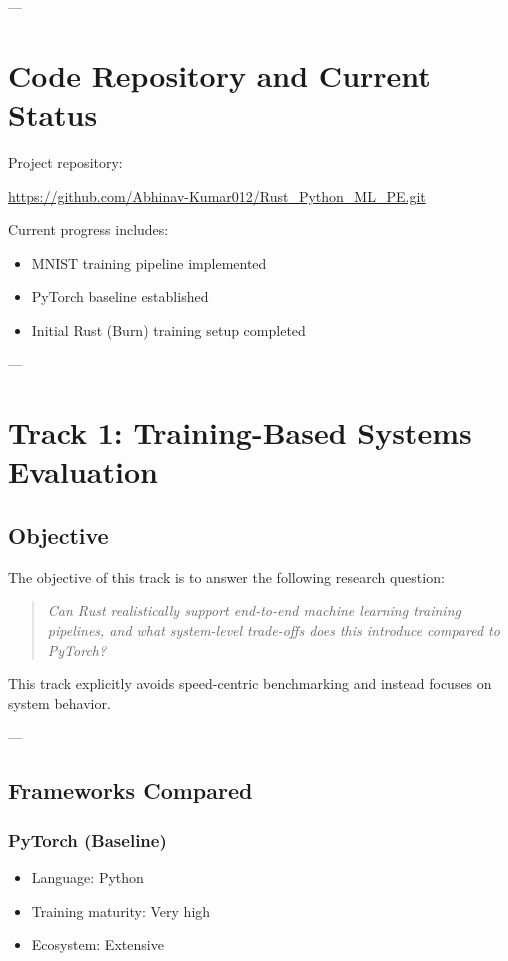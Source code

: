 \documentclass[10pt,a4paper,twocolumn]{article}
\begin{document}
---

\section{Code Repository and Current Status}

Project repository:
\begin{center}
\url{https://github.com/Abhinav-Kumar012/Rust_Python_ML_PE.git}
\end{center}

Current progress includes:
\begin{itemize}
    \item MNIST training pipeline implemented
    \item PyTorch baseline established
    \item Initial Rust (Burn) training setup completed
\end{itemize}

---

\section{Track 1: Training-Based Systems Evaluation}

\subsection{Objective}

The objective of this track is to answer the following research question:

\begin{quote}
\textit{Can Rust realistically support end-to-end machine learning training pipelines, and what system-level trade-offs does this introduce compared to PyTorch?}
\end{quote}

This track explicitly avoids speed-centric benchmarking and instead focuses on system behavior.

---

\subsection{Frameworks Compared}

\subsubsection{PyTorch (Baseline)}
\begin{itemize}
    \item Language: Python
    \item Training maturity: Very high
    \item Ecosystem: Extensive
\end{itemize}
\end{document}
